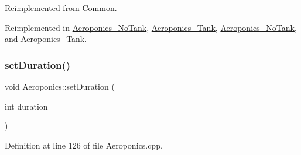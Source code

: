 Reimplemented from \hyperlink{class_common_a9e60e2c26a5f4d72342a59a969954636}{Common}.



Reimplemented in \hyperlink{class_aeroponics___no_tank_af2f6dfdcfd4365ed35aa83176113ff86}{Aeroponics\+\_\+\+No\+Tank}, \hyperlink{class_aeroponics___tank_a45e50ca4e5d5a605d355d65c8cd3e5cd}{Aeroponics\+\_\+\+Tank}, \hyperlink{class_aeroponics___no_tank_af2f6dfdcfd4365ed35aa83176113ff86}{Aeroponics\+\_\+\+No\+Tank}, and \hyperlink{class_aeroponics___tank_a45e50ca4e5d5a605d355d65c8cd3e5cd}{Aeroponics\+\_\+\+Tank}.

\mbox{\label{class_aeroponics_a0414c6a5be2ff2da7d88e83cc2364110}} 
\subsubsection{\texorpdfstring{set\+Duration()}{setDuration()}\hspace{0.1cm}{\footnotesize\ttfamily [1/2]}}
{\footnotesize\ttfamily void Aeroponics\+::set\+Duration (\begin{DoxyParamCaption}\item[{int}]{duration }\end{DoxyParamCaption})\hspace{0.3cm}{\ttfamily [protected]}}



Definition at line 126 of file Aeroponics.\+cpp.


